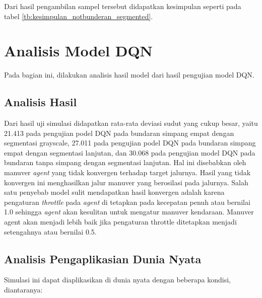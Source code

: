 Dari hasil pengambilan sampel tersebut didapatkan kesimpulan seperti pada tabel \ref{tb:kesimpulan_notbunderan_segmented}.

\begin{table}[H]
	\caption{Kesimpulan Hasil Model DQN pada Bundaran Tanpa Simpang dengan Segmentasi Lanjutan.}
	\label{tb:kesimpulan_notbunderan_segmented}
\end{table}

\section{Analisis Model DQN}
\label{sec:analisis_model_dqn}
Pada bagian ini, dilakukan analisis hasil model dari hasil pengujian model DQN.

\subsection{Analisis Hasil}
\label{sec:anlisis_hasil}

Dari hasil uji simulasi didapatkan rata-rata deviasi sudut yang cukup besar, yaitu 21.413 pada pengujian podel DQN pada bundaran simpang empat dengan segmentasi grayscale, 27.011 pada pengujian podel DQN pada bundaran simpang empat dengan segmentasi lanjutan, dan 30.068 pada pengujian model DQN pada bundaran tanpa simpang dengan segmentasi lanjutan. Hal ini disebabkan oleh manuver \textit{agent }yang tidak konvergen terhadap target jalurnya. Hasil yang tidak konvergen ini menghasilkan jalur manuver yang berosilasi pada jalurnya. Salah satu penyebab model sulit mendapatkan hasil konvergen adalah karena pengaturan \textit{throttle} pada \textit{agent} di tetapkan pada kecepatan penuh atau bernilai 1.0 sehingga \textit{agent} akan kesulitan untuk mengatur manuver kendaraan. Manuver agent akan menjadi lebih baik jika pengaturan throttle ditetapkan menjadi setengahnya atau bernilai 0.5.

\subsection{Analisis Pengaplikasian Dunia Nyata}
\label{sec:aplikasi_realworld}
Simulasi ini dapat diaplikasikan di dunia nyata dengan beberapa kondisi, diantaranya:

